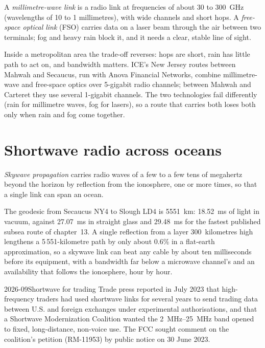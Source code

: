 \begin{definition}\label{def:nw:long-haul-wireless:mmw}
A \emph{millimetre-wave link} is a radio link at frequencies of about 30 to 300~GHz (wavelengths of 10 to 1
millimetres), with wide channels and short hops. A \emph{free-space optical link} (FSO) carries data on a laser
beam through the air between two terminals; fog and heavy rain block it, and it needs a clear, stable line of sight.
\end{definition}

Inside a metropolitan area the trade-off reverses: hops are short, rain has little path to act on, and bandwidth matters. ICE's New Jersey
routes between Mahwah and Secaucus, run with Anova Financial Networks, combine millimetre-wave and free-space optics over 5-gigabit radio
channels; between Mahwah and Carteret they use several 1-gigabit channels. The two technologies fail differently (rain for millimetre waves,
fog for lasers), so a route that carries both loses both only when rain and fog come together.

\section{Shortwave radio across oceans}

\begin{definition}\label{def:nw:long-haul-wireless:sky}
\emph{Skywave propagation} carries radio waves of a few to a few tens of megahertz beyond the horizon by reflection from
the ionosphere, one or more times, so that a single link can span an ocean.
\end{definition}

The geodesic from Secaucus NY4 to Slough LD4 is \qty{5551}{\kilo\metre}: \qty{18.52}{\milli\second} of light in vacuum, against
\qty{27.07}{\milli\second} in straight glass and \qty{29.48}{\milli\second} for the fastest published subsea route of chapter~13. A single reflection
from a layer 300~kilometres high lengthens a 5\,551-kilometre path by only about 0.6\% in a flat-earth approximation, so a skywave link can
beat any cable by about ten milliseconds before its equipment, with a bandwidth far below a microwave channel's and an availability that follows the ionosphere, hour by hour.

\begin{dated}{2026-09}{Shortwave for trading}\label{dat:nw:long-haul-wireless:hf}
Trade press reported in July 2023 that high-frequency traders had used shortwave links for several years to send trading data between U.S. and
foreign exchanges under experimental authorisations, and that a Shortwave Modernization Coalition wanted the \qtyrange{2}{25}{\mega\hertz} band
opened to fixed, long-distance, non-voice use. The FCC sought comment on the coalition's petition (RM-11953) by public notice on 30 June 2023.
\end{dated}

